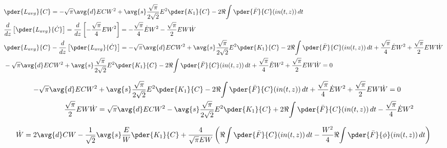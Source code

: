 \begin{itemize}
\begin{equation}
\begin{split}
&\pder{L_{avg}}{C} =  -\sqrt{\pi} \avg{d} E C W^2 + \avg{s} \frac{\sqrt{\pi}}{2\sqrt{2}} E^2 \pder{K_1}{C} - 2\Re{\int \pder{\bar{F}}{C} (in(t,z))\,dt}\\
&\frac{d}{dz}\left[\pder{L_{avg}}{\dot{C}}\right] = \frac{d}{dz}\left[-\frac{\sqrt{\pi}}{4} E W^2 \right] = -\frac{\sqrt{\pi}}{4} \dot{E} W^2 - \frac{\sqrt{\pi}}{2} E W\dot{W}\\
&\pder{L_{avg}}{C} -\frac{d}{dz}\left[\pder{L_{avg}}{\dot{C}}\right] = -\sqrt{\pi} \avg{d} E C W^2 + \avg{s} \frac{\sqrt{\pi}}{2\sqrt{2}} E^2 \pder{K_1}{C} - 2\Re{\int \pder{\bar{F}}{C} (in(t,z))\,dt}  + \frac{\sqrt{\pi}}{4} \dot{E} W^2 + \frac{\sqrt{\pi}}{2} E W\dot{W}\\
&-\sqrt{\pi} \avg{d} E C W^2 + \avg{s} \frac{\sqrt{\pi}}{2\sqrt{2}} E^2 \pder{K_1}{C} - 2\Re{\int \pder{\bar{F}}{C} (in(t,z))\,dt}  + \frac{\sqrt{\pi}}{4} \dot{E} W^2 + \frac{\sqrt{\pi}}{2} E W\dot{W} = 0\\
\end{split}
\end{equation}

\begin{equation}
\begin{split}
-\sqrt{\pi} \avg{d} E C W^2 &+ \avg{s} \frac{\sqrt{\pi}}{2\sqrt{2}} E^2 \pder{K_1}{C} - 2\Re{\int \pder{\bar{F}}{C} (in(t,z))\,dt}  + \frac{\sqrt{\pi}}{4} \dot{E} W^2 + \frac{\sqrt{\pi}}{2} E W\dot{W} = 0\\
 \frac{\sqrt{\pi}}{2} E W\dot{W} &= \sqrt{\pi} \avg{d} E C W^2 - \avg{s} \frac{\sqrt{\pi}}{2\sqrt{2}} E^2 \pder{K_1}{C} + 2\Re{\int \pder{\bar{F}}{C} (in(t,z))\,dt}  - \frac{\sqrt{\pi}}{4} \dot{E} W^2 \\
\end{split}
\end{equation}


\begin{equation}
\begin{split}
\dot{W} &=  2 \avg{d} C W - \frac{1}{\sqrt{2}} \avg{s} \frac{E}{W} \pder{K_1}{C} + \frac{4}{\sqrt{\pi}E W}\left(\Re{\int \pder{\bar{F}}{C} (in(t,z))\,dt} - \frac{W^2}{4}\Re{\int \pder{\bar{F}}{\phi} (in(t,z))\,dt} \right)  \\
\end{split}
\end{equation}




\end{itemize}
